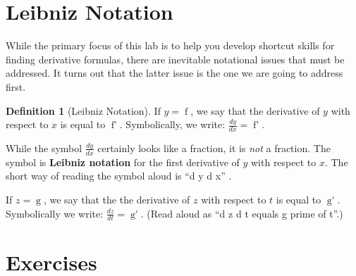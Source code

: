 \documentclass[12pt,]{book}
\newcommand{\terminology}[1]{\textbf{#1}}
\theoremstyle{plain}
\theoremstyle{definition}
\newtheorem{definition}[theorem]{Definition}
\numberwithin{equation}{section}
\newcommand{\fe}[2]{\mathop{{#1}{\left(#2\right)}}}
\newcommand{\fd}[1]{#1'}
\newcommand{\lz}[2]{\frac{d#1}{d#2}}
\begin{document}
\section[Leibniz Notation]{Leibniz Notation}\label{section-leibniz-notation}
While the primary focus of this lab is to help you develop shortcut skills for finding derivative formulas, there are inevitable notational issues that must be addressed.  It turns out that the latter issue is the one we are going to address first.%
\begin{definition}[Leibniz Notation]\label{definition-9}
If \(y=\fe{f}{x}\), we say that the derivative of \(y\) with respect to \(x\) is equal to \(\fe{\fd{f}}{x}\). Symbolically, we write: \(\lz{y}{x}=\fe{\fd{f}}{x}\).%
\par
While the symbol \(\lz{y}{x}\) certainly looks like a fraction, it is \emph{not} a fraction.  The symbol is \terminology{Leibniz notation} for the first derivative of \(y\) with respect to \(x\).  The short way of reading the symbol aloud is ``d y d x''%
.

            \par
If \(z=\fe{g}{t}\), we say that the the derivative of \(z\) with respect to \(t\) is equal to \(\fe{\fd{g}}{t}\).  Symbolically we write: \(\lz{z}{t}=\fe{\fd{g}}{t}\). (Read aloud as ``d z d t equals g prime of t''.)%
\end{definition}
\typeout{************************************************}
\typeout{************************************************}
\section*{Exercises}\label{exercises-29}
\end{document}
